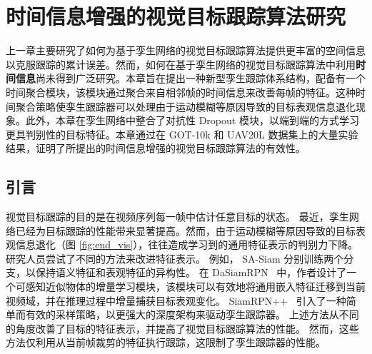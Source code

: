 \chapter{时间信息增强的视觉目标跟踪算法研究}\label{chap:end}
上一章主要研究了如何为基于孪生网络的视觉目标跟踪算法提供更丰富的空间信息以克服跟踪的累计误差。然而，如何在基于孪生网络的视觉目标跟踪算法中利用\textbf{时间信息}尚未得到广泛研究。本章旨在提出一种新型孪生跟踪体系结构，配备有一个时间聚合模块，该模块通过聚合来自相邻帧的时间信息来改善每帧的特征。这种时间聚合策略使孪生跟踪器可以处理由于运动模糊等原因导致的目标表观信息退化现象。此外，本章在孪生网络中整合了对抗性 Dropout 模块，以端到端的方式学习更具判别性的目标特征。本章通过在 GOT-10k \cite{GOT-10k} 和 UAV20L \cite{mueller2016benchmark} 数据集上的大量实验结果，证明了所提出的时间信息增强的视觉目标跟踪算法的有效性。

\section{引言}
视觉目标跟踪的目的是在视频序列每一帧中估计任意目标的状态。 
最近，孪生网络已经为目标跟踪的性能带来显著提高。然而，由于运动模糊等原因导致的目标表观信息退化（图 \ref{fig:end_vis}），往往造成学习到的通用特征表示的判别力下降。
研究人员尝试了不同的方法来改进特征表示。
例如，
SA-Siam \cite{he2018twofold} 分别训练两个分支，以保持语义特征和表观特征的异构性。
在 DaSiamRPN~\cite{zhu2018distractor} 中，作者设计了一个可感知近似物体的增量学习模块，该模块可以有效地将通用嵌入特征迁移到当前视频域，并在推理过程中增量捕获目标表观变化。
SiamRPN++~\cite{SiamRPN++} 引入了一种简单而有效的采样策略，以更强大的深度架构来驱动孪生跟踪器。
上述方法从不同的角度改善了目标的特征表示，并提高了视觉目标跟踪算法的性能。
然而，这些方法仅利用从当前帧裁剪的特征执行跟踪，这限制了孪生跟踪器的性能。

